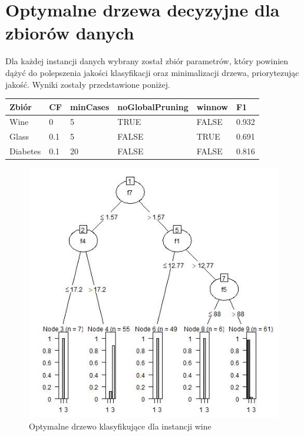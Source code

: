 \documentclass[12pt,a4paper]{article}
\begin{document}
\section{Optymalne drzewa decyzyjne dla zbiorów danych}
Dla każdej instancji danych wybrany został zbiór parametrów, który powinien dążyć do polepszenia jakości klasyfikacji oraz minimalizacji drzewa, priorytezując jakość. Wyniki zostały przedstawione poniżej.

\vspace{5mm}
\begin{tabular}{ |p{3cm}||p{1cm}|p{2cm}|p{3cm}|p{2cm}|p{2cm}|}
\hline
Zbiór &CF &minCases &noGlobalPruning &winnow & F1\\
\hline
Wine &0 &5 &TRUE &FALSE &0.932\\
Glass &0.1 &5 &FALSE &TRUE &0.691\\
Diabetes &0.1 &20 &FALSE &FALSE &0.816\\
\hline
\end{tabular}
\vspace{5mm}

\begin{figure}[H]
\centering
\includegraphics[width=1\textwidth]{wineOptimal.jpg}
\caption{Optymalne drzewo klasyfikujące dla instancji wine}
\end{figure}
\end{document}
